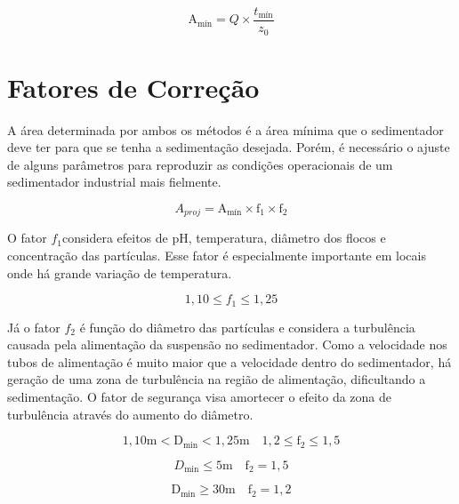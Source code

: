 \begin{equation}\label{key}
\operatorname{A_{\text{mín}}}=Q \times \frac{t_{\text{mín}}}{z_{0}}
\end{equation}


\section{Fatores de Correção}

A área determinada por ambos os métodos é a área mínima que o sedimentador deve ter para que se tenha a sedimentação desejada. Porém, é necessário o ajuste de alguns parâmetros para reproduzir as condições operacionais de um sedimentador industrial mais fielmente.


\begin{equation}\label{key}
A_{proj}=\operatorname{A_{\text{mín}}} \times \mathrm{f}_{1} \times \mathrm{f}_{2}
\end{equation}

O fator $ f_{1} $considera efeitos de pH, temperatura, diâmetro dos flocos e concentração das partículas. Esse fator é especialmente importante em locais onde há grande variação de temperatura.

\begin{equation}\label{key}
1,10 \leq f_{1} \leq 1,25
\end{equation}


Já o fator $ f_{2} $ é função do diâmetro das partículas e considera a turbulência causada pela alimentação da suspensão no sedimentador. Como a velocidade nos tubos de alimentação é muito maior que a velocidade dentro do sedimentador, há geração de uma zona de turbulência na região de alimentação, dificultando a sedimentação. O fator de segurança visa amortecer o efeito da zona de turbulência através do aumento do diâmetro.

\begin{equation}\label{key}
1,10 \mathrm{m}<\mathrm{D}_{\mathrm{min}}<1,25 \mathrm{m} \quad 1,2 \leq \mathrm{f}_{2} \leq 1,5
\end{equation}

\begin{equation}\label{key}
D_{\min } \leq 5 \mathrm{m} \quad \mathrm{f}_{2}=1,5
\end{equation}

\begin{equation}\label{key}
\mathrm{D}_{\mathrm{min}} \geq 30 \mathrm{m} \quad \mathrm{f}_{2}=1,2
\end{equation}


